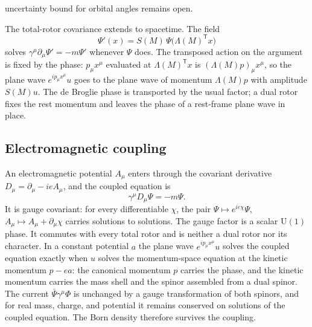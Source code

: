 \documentclass[a4paper]{article}
\begin{document}
uncertainty bound for orbital angles remains open.

The total-rotor covariance extends to spacetime. The field
\[
\Psi'(x)=S(M)\,\Psi\bigl(\Lambda(M)^{\mathsf T}x\bigr)
\]
solves $\gamma^\mu\partial_\mu\Psi'=-m\Psi'$ whenever $\Psi$ does. The transposed action on the argument is fixed by the phase: $p_\mu x^\mu$ evaluated at $\Lambda(M)^{\mathsf T}x$ is $(\Lambda(M)p)_\mu x^\mu$, so the plane wave $e^{ip_\mu x^\mu}u$ goes to the plane wave of momentum $\Lambda(M)p$ with amplitude $S(M)u$. The de Broglie phase is transported by the usual factor; a dual rotor fixes the rest momentum and leaves the phase of a rest-frame plane wave in place.

\subsection{Electromagnetic coupling}

An electromagnetic potential $A_\mu$ enters through the covariant derivative $D_\mu=\partial_\mu-ieA_\mu$, and the coupled equation is
\[
\gamma^\mu D_\mu\Psi=-m\Psi .
\]
It is gauge covariant: for every differentiable $\chi$, the pair $\Psi\mapsto e^{ie\chi}\Psi$, $A_\mu\mapsto A_\mu+\partial_\mu\chi$ carries solutions to solutions. The gauge factor is a scalar $\mathrm{U}(1)$ phase. It commutes with every total rotor and is neither a dual rotor nor its character. In a constant potential $a$ the plane wave $e^{ip_\mu x^\mu}u$ solves the coupled equation exactly when $u$ solves the momentum-space equation at the kinetic momentum $p-ea$: the canonical momentum $p$ carries the phase, and the kinetic momentum carries the mass shell and the spinor assembled from a dual spinor. The current $\bar\Psi\gamma^\mu\Phi$ is unchanged by a gauge transformation of both spinors, and for real mass, charge, and potential it remains conserved on solutions of the coupled equation. The Born density therefore survives the coupling.
\end{document}
